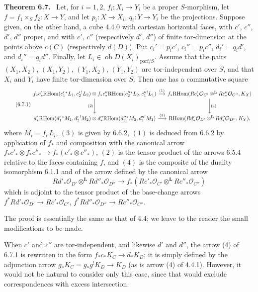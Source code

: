 \documentclass[11pt]{article}
\providecommand{\cO}{\mathcal{O}}
\newenvironment{statement}[1]{\par\medskip\noindent\textbf{#1.}\ }{\par\medskip}
\providecommand{\RHom}{\mathrm{RHom}}
\begin{document}
\begin{statement}{Theorem 6.7}
Let, for $i=1,2$, $f_i:X_i\to Y_i$ be a proper $S$-morphism, let $f=f_1\times_Sf_2:X\to Y$, and let $p_i:X\to X_i$, $q_i:Y\to Y_i$ be the projections. Suppose given, on the other hand, a cube 4.4.0 with cartesian horizontal faces, with $c'$, $c''$, $d'$, $d''$ proper, and with $c'$, $c''$ (respectively $d'$, $d''$) of finite tor-dimension at the points above $c(C)$ (respectively $d(D)$). Put $c_i'=p_ic'$, $c_i''=p_ic''$, $d_i'=q_id'$, and $d_i''=q_id''$. Finally, let $L_i\in\operatorname{ob}D(X_i)_{\mathrm{parf}/S}$. Assume that the pairs $(X_1,X_2)$, $(X_1,Y_2)$, $(Y_1,X_2)$, $(Y_1,Y_2)$ are tor-independent over $S$, and that $X_i$ and $Y_i$ have finite tor-dimension over $S$. Then one has a commutative square
\begin{equation}
\tag{6.7.1}
\begin{tikzcd}[column sep=small,row sep=large]
f_*c'_*\RHom(c_1'{}^*L_1,c_2'{}^!L_2)\otimes f_*c''_*\RHom(c_2''{}^*L_2,c_1''{}^!L_1) \arrow[r,"(1)"] \arrow[d,"(2)"']
& f_*\RHom(Rc'_*\cO_{C'}\otimes^{\mathbf L}Rc''_*\cO_{C''},K_X) \arrow[d,"(4)"] \\
d'_*\RHom(d_1'{}^*M_1,d_2'{}^!M_2)\otimes d''_*\RHom(d_2''{}^*M_2,d_1''{}^!M_1) \arrow[r,"(3)"]
& \RHom(Rd'_*\cO_{D'}\otimes^{\mathbf L}Rd''_*\cO_{D''},K_Y),
\end{tikzcd}
\end{equation}
where $M_i=f_{i!}L_i$, $(3)$ is given by 6.6.2, $(1)$ is deduced from 6.6.2 by application of $f_*$ and composition with the canonical arrow $f_*c'_*\otimes f_*c''_*\to f_*(c'_*\otimes c''_*)$, $(2)$ is the tensor product of the arrows 6.5.4 relative to the faces containing $f$, and $(4)$ is the composite of the duality isomorphism 6.1.1 and of the arrow defined by the canonical arrow
\[
Rd'_*\cO_{D'}\otimes^{\mathbf L}Rd''_*\cO_{D''}\longrightarrow f_*(Rc'_*\cO_{C'}\otimes^{\mathbf L}Rc''_*\cO_{C''})
\]
which is adjoint to the tensor product of the base-change arrows $f^*Rd'_*\cO_{D'}\to Rc'_*\cO_{C'}$, $f^*Rd''_*\cO_{D''}\to Rc''_*\cO_{C''}$.
\end{statement}

The proof is essentially the same as that of 4.4; we leave to the reader the small modifications to be made.

When $c'$ and $c''$ are tor-independent, and likewise $d'$ and $d''$, the arrow (4) of 6.7.1 is rewritten in the form $f_*c_*K_C\to d_*K_D$; it is simply defined by the adjunction arrow $g_*K_C=g_*g^!K_D\to K_D$ (as is arrow (4) of 4.4.1). However, it would not be natural to consider only this case, since that would exclude correspondences with excess intersection.
\end{document}
